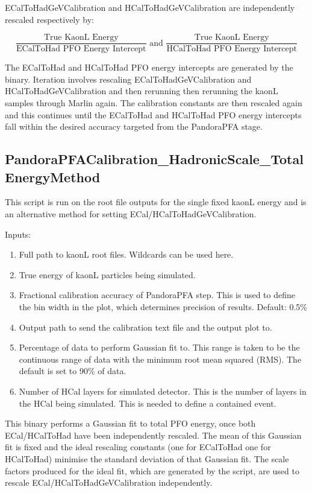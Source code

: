 \documentclass[11pt, oneside]{article}   	%
\begin{document}
ECalToHadGeVCalibration and HCalToHadGeVCalibration are independently rescaled respectively by:

\begin{equation}
\frac{\text{True KaonL Energy}}{\text{ECalToHad PFO Energy Intercept}} \text{ and } \frac{\text{True KaonL Energy}}{\text{HCalToHad PFO Energy Intercept}} 
\end{equation}

The ECalToHad and HCalToHad PFO energy intercepts are generated by the binary.  Iteration involves rescaling ECalToHadGeVCalibration and HCalToHadGeVCalibration and then rerunning then rerunning the kaonL samples through Marlin again.  The calibration constants are then rescaled again and this continues until the ECalToHad and HCalToHad PFO energy intercepts fall within the desired accuracy targeted from the PandoraPFA stage.

\subsection{PandoraPFACalibration\_HadronicScale\_TotalEnergyMethod}

This script is run on the root file outputs for the single fixed kaonL energy and is an alternative method for setting ECal/HCalToHadGeVCalibration.

Inputs:
\begin{enumerate}
\item Full path to kaonL root files.  Wildcards can be used here.
\item True energy of kaonL particles being simulated.
\item Fractional calibration accuracy of PandoraPFA step.  This is used to define the bin width in the plot, which determines precision of results.  Default: 0.5\%
\item Output path to send the calibration text file and the output plot to.
\item Percentage of data to perform Gaussian fit to.  This range is taken to be the continuous range of data with the minimum root mean squared (RMS).  The default is set to 90\% of data.
\item Number of HCal layers for simulated detector.  This is the number of layers in the HCal being simulated.  This is needed to define a contained event.
\end{enumerate}

This binary performs a Gaussian fit to total PFO energy, once both ECal/HCalToHad have been independently rescaled.  The mean of this Gaussian fit is fixed and the ideal rescaling constants (one for ECalToHad one for HCalToHad) minimise the standard deviation of that Gaussian fit.  The scale factors produced for the ideal fit, which are generated by the script, are used to rescale ECal/HCalToHadGeVCalibration independently.
\end{document}

